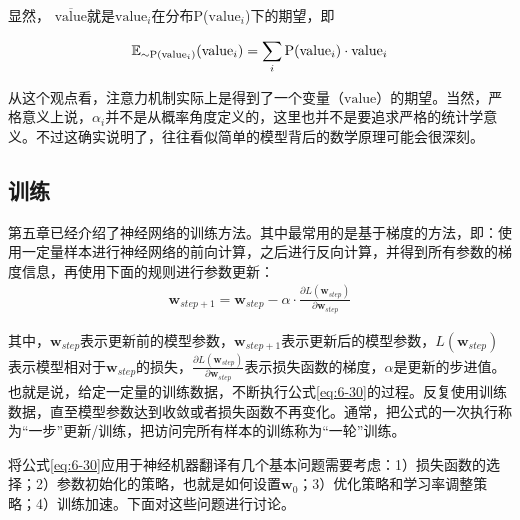 \noindent 显然， $\overline{\mathrm{value}}$就是$\mathrm{value}_i$在分布P($\mathrm{value}_i$)下的期望，即

\begin{equation}
\mathbb{E}_{\sim \\ \textrm{P}( {\mathrm{\mathrm{value}}}_i )} ({\mathrm{value}}_i) = \sum_i \textrm{P}({\mathrm{value}}_i) \cdot {\mathrm{value}}_i
\label{eq:6-29}
\end{equation}

从这个观点看，注意力机制实际上是得到了一个变量（$\mathrm{value}$）的期望。当然，严格意义上说，$\alpha_i$并不是从概率角度定义的，这里也并不是要追求严格的统计学意义。不过这确实说明了，往往看似简单的模型背后的数学原理可能会很深刻。


\subsection{训练}

\parinterval 第五章已经介绍了神经网络的训练方法。其中最常用的是基于梯度的方法，即：使用一定量样本进行神经网络的前向计算，之后进行反向计算，并得到所有参数的梯度信息，再使用下面的规则进行参数更新：
\begin{eqnarray}
\mathbf{w}_{step+1} = \mathbf{w}_{step} - \alpha \cdot \frac{\partial L(\mathbf{w}_{step})} {\partial \mathbf{w}_{step} }
\label{eq:6-30}
\end{eqnarray}

\noindent 其中，$\mathbf{w}_{step}$表示更新前的模型参数，$\mathbf{w}_{step+1}$表示更新后的模型参数，$L(\mathbf{w}_{step})$表示模型相对于$\mathbf{w}_{step}$的损失，$\frac{\partial L(\mathbf{w}_{step})} {\partial \mathbf{w}_{step} }$表示损失函数的梯度，$\alpha$是更新的步进值。也就是说，给定一定量的训练数据，不断执行公式\ref{eq:6-30}的过程。反复使用训练数据，直至模型参数达到收敛或者损失函数不再变化。通常，把公式的一次执行称为``一步''更新/训练，把访问完所有样本的训练称为``一轮''训练。

\parinterval 将公式\ref{eq:6-30}应用于神经机器翻译有几个基本问题需要考虑：1）损失函数的选择；2）参数初始化的策略，也就是如何设置$\mathbf{w}_0$；3）优化策略和学习率调整策略；4）训练加速。下面对这些问题进行讨论。


